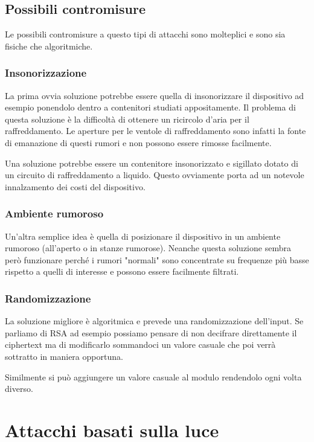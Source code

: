 	\subsection{Possibili contromisure}	
		Le possibili contromisure a questo tipi di attacchi sono molteplici e sono sia fisiche che algoritmiche.
		
		\subsubsection*{Insonorizzazione}			
			La prima ovvia soluzione potrebbe essere quella di insonorizzare il dispositivo ad esempio ponendolo dentro a contenitori studiati appositamente. Il problema di questa soluzione è la difficoltà di ottenere un ricircolo d'aria per il raffreddamento. Le aperture per le ventole di raffreddamento sono infatti la fonte di emanazione di questi rumori e non possono essere rimosse facilmente. 
			
			Una soluzione potrebbe essere un contenitore insonorizzato e sigillato dotato di un circuito di raffreddamento a liquido. Questo ovviamente porta ad un notevole innalzamento dei costi del dispositivo.
			
		\subsubsection*{Ambiente rumoroso}		
			Un'altra semplice idea è quella di posizionare il dispositivo in un ambiente rumoroso (all'aperto o in stanze rumorose). Neanche questa soluzione sembra però funzionare perché i rumori "normali" sono concentrate su frequenze più basse rispetto a quelli di interesse e possono essere facilmente filtrati.
			
		\subsubsection*{Randomizzazione}		
			La soluzione migliore è algoritmica e prevede una randomizzazione dell'input. Se parliamo di RSA ad esempio possiamo pensare di non decifrare direttamente il ciphertext ma di modificarlo sommandoci un valore casuale che poi verrà sottratto in maniera opportuna. 
			
			Similmente si può aggiungere un valore casuale al modulo rendendolo ogni volta diverso.
			
	\section{Attacchi basati sulla luce}
		
